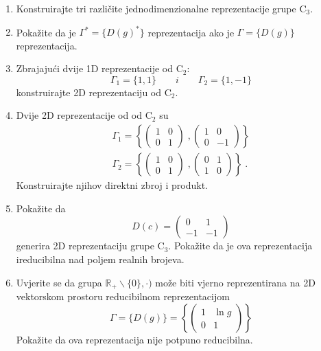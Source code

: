 \begin{enumerate}[label=\arabic{chapter}.\arabic*.]

\item Konstruirajte tri različite jednodimenzionalne reprezentacije
grupe C$_3$.

\item \label{zad:complex} Pokažite da je $\Gamma^* = \{ D(g)^* \}$ reprezentacija ako je
                     $\Gamma   = \{ D(g)   \}$ reprezentacija.

\item Zbrajajući dvije 1D reprezentacije od C$_2$:
\begin{equation}
 \Gamma_1 = \{1, 1\} \qquad i \qquad \Gamma_2 = \{1, -1\}
\end{equation}
konstruirajte 2D reprezentaciju od C$_2$.

\item Dvije 2D reprezentacije od od C$_2$ su
\begin{align*}
\Gamma_1 = \left\{
\begin{pmatrix}
 1 & 0 \\ 0 & 1
\end{pmatrix}\;,
\begin{pmatrix}
 1 & 0 \\ 0 & -1
\end{pmatrix}\right\} \\
\Gamma_2 = \left\{
\begin{pmatrix}
 1 & 0 \\ 0 & 1
\end{pmatrix}\;,
\begin{pmatrix}
 0 & 1 \\ 1 & 0
\end{pmatrix}\right\}\;.
\end{align*}
Konstruirajte njihov direktni zbroj i produkt.

\item Pokažite da
\begin{equation*}
 D(c) = 
\begin{pmatrix}
0 & 1 \\
-1 & -1
\end{pmatrix}
\end{equation*}
generira 2D reprezentaciju grupe C$_3$. Pokažite da je ova reprezentacija
ireducibilna nad poljem realnih brojeva.

\item \label{zad:lnred} Uvjerite se da grupa $\mathbb{R}_{+}\backslash \{0\}, \cdot )$
može biti vjerno reprezentirana na 2D vektorskom prostoru reducibilnom
reprezentacijom
\begin{equation*}
\Gamma = \{ D(g) \} = \left\{
\begin{pmatrix}
1 & \ln g  \\
0 & 1
\end{pmatrix}\right\}
\end{equation*}
Pokažite da ova reprezentacija nije potpuno reducibilna.


\end{enumerate}
